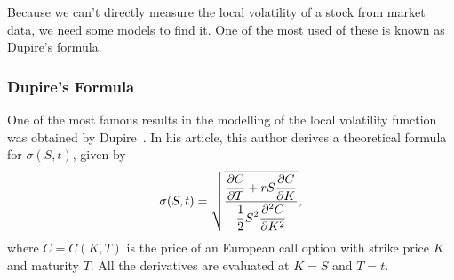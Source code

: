Because we can't directly measure the local volatility of a stock from market data, we need some models to find it. One of the most used of these is known as Dupire's formula.

\subsubsection{Dupire's Formula}
\label{subsubsection:Dupire}
One of the most famous results in the modelling of the local volatility function was obtained by Dupire~\cite{Dupire}. In his article, this author derives a theoretical formula for $\sigma(S,t)$, given by
\begin{equation}\label{dupire}
\sigma(S,t)=\sqrt{\frac{\displaystyle\pdv{C}{T}+rS\pdv{C}{K}}{\displaystyle\frac{1}{2}S^2\pdv{^2C}{K^2}}},
\end{equation}
\noindent where $C=C(K,T)$ is the price of an European call option with strike price $K$ and maturity $T$. All the derivatives are evaluated at $K=S$ and $T=t$.




